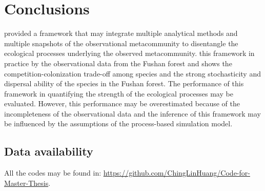 \DIFdelend \chapter*{Conclusions}
\setcounter{chapter}{6}
\noindent
\citet{guzman2022accounting} provided a framework that may integrate multiple analytical methods and multiple snapshots of the observational metacommunity to disentangle the ecological processes underlying the observed metacommunity. \DIFdelbegin {}\DIFdelend \DIFaddbegin {}\DIFaddend this framework in practice by the observational data from the Fushan forest and shows the competition-colonization trade-off among species and the strong stochasticity and dispersal ability of the species in the Fushan forest. The performance of this framework in quantifying the strength of the ecological processes may be evaluated. However, this performance may be overestimated because of the incompleteness of the observational data and the inference of this framework may be influenced by the assumptions of the process-based simulation model.


\section*{Data availability}
\noindent
All the codes may be found in: \url{https://github.com/ChingLinHuang/Code-for-Master-Thesis}.
